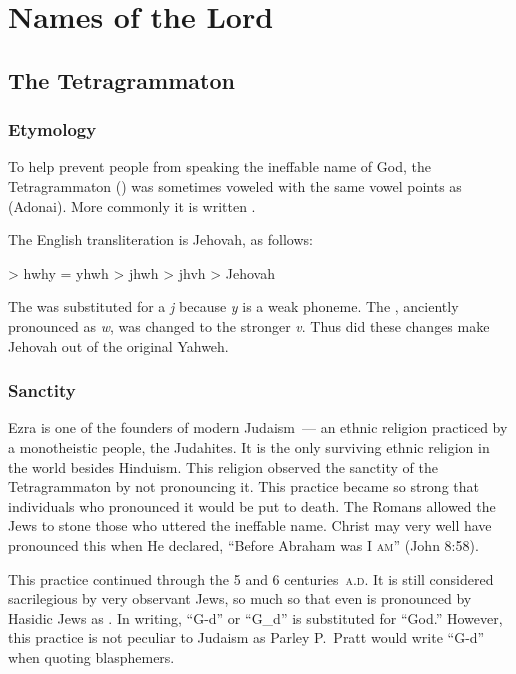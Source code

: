 \section{Names of the Lord}\label{app:names-of-the-lord}
\subsection{The Tetragrammaton}
\subsubsection{Etymology}
To help prevent people from speaking the ineffable name of God, the Tetragrammaton () was sometimes voweled with the same vowel points as  (Adonai). More commonly it is written .

The English transliteration is Jehovah, as follows:
\begin{center}
   > hwhy = yhwh > jhwh > jhvh > Jehovah
\end{center}
The  was substituted for a \textit{j} because \textit{y} is a weak phoneme. The , anciently pronounced as \textit{w}, was changed to the stronger \textit{v}. Thus did these changes make Jehovah out of the original Yahweh.


\subsubsection{Sanctity}
Ezra is one of the founders of modern Judaism~--- an ethnic religion practiced by a monotheistic people, the Judahites. It is the only surviving ethnic religion in the world besides Hinduism. This religion observed the sanctity of the Tetragrammaton by not pronouncing it. This practice became so strong that individuals who pronounced it would be put to death. The Romans allowed the Jews to stone those who uttered the ineffable name. Christ may very well have pronounced this when He declared, ``Before Abraham was \textsc{I am}'' (John 8:58).

This practice continued through the 5 and 6 centuries~\textsc{a.d.} It is still considered sacrilegious by very observant Jews, so much so that even  is pronounced by Hasidic Jews as . In writing, ``G-d'' or ``G\_{}d'' is substituted for ``God.'' However, this practice is not peculiar to Judaism as Parley P.\ Pratt would write ``G-d'' when quoting blasphemers.

